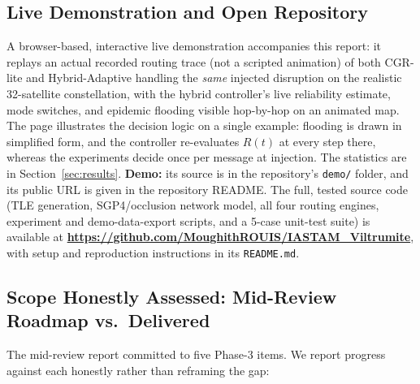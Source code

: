 \documentclass[10pt,twocolumn]{article}
\begin{document}
\subsection{Live Demonstration and Open Repository}
A browser-based, interactive live demonstration accompanies this report: it replays an actual recorded routing trace (not a scripted animation) of both CGR-lite and Hybrid-Adaptive handling the \emph{same} injected disruption on the realistic 32-satellite constellation, with the hybrid controller's live reliability estimate, mode switches, and epidemic flooding visible hop-by-hop on an animated map. The page illustrates the decision logic on a single example: flooding is drawn in simplified form, and the controller re-evaluates $R(t)$ at every step there, whereas the experiments decide once per message at injection. The statistics are in Section~\ref{sec:results}. \textbf{Demo:} its source is in the repository's \texttt{demo/} folder, and its public URL is given in the repository README. The full, tested source code (TLE generation, SGP4/occlusion network model, all four routing engines, experiment and demo-data-export scripts, and a 5-case unit-test suite) is available at \textbf{\url{https://github.com/MoughithROUIS/IASTAM_Viltrumite}}, with setup and reproduction instructions in its \texttt{README.md}.

\subsection{Scope Honestly Assessed: Mid-Review Roadmap vs.\ Delivered}
\label{sec:scope}

The mid-review report committed to five Phase-3 items. We report progress against each honestly rather than reframing the gap:
\end{document}
